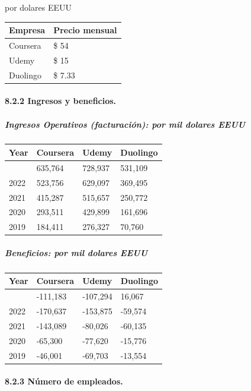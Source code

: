 \documentclass[
]{article}
\begin{document}
por dolares EEUU

\begin{longtable}[]{@{}ll@{}}
\toprule\noalign{}
Empresa & Precio mensual \\
\midrule\noalign{}
\endhead
\bottomrule\noalign{}
\endlastfoot
Coursera & \$ 54 \\
Udemy & \$ 15 \\
Duolingo & \$ 7.33 \\
\end{longtable}

\paragraph{8.2.2 Ingresos y beneficios.}\label{ingresos-y-beneficios.}

\subparagraph{Ingresos Operativos (facturación): por mil dolares
EEUU}\label{ingresos-operativos-facturaciuxf3n-por-mil-dolares-eeuu}

\begin{longtable}[]{@{}llll@{}}
\toprule\noalign{}
Year & Coursera & Udemy & Duolingo \\
\midrule\noalign{}
\endhead
\bottomrule\noalign{}
\endlastfoot
2023 & 635,764 & 728,937 & 531,109 \\
2022 & 523,756 & 629,097 & 369,495 \\
2021 & 415,287 & 515,657 & 250,772 \\
2020 & 293,511 & 429,899 & 161,696 \\
2019 & 184,411 & 276,327 & 70,760 \\
\end{longtable}

\subparagraph{Beneficios: por mil dolares
EEUU}\label{beneficios-por-mil-dolares-eeuu}

\begin{longtable}[]{@{}llll@{}}
\toprule\noalign{}
Year & Coursera & Udemy & Duolingo \\
\midrule\noalign{}
\endhead
\bottomrule\noalign{}
\endlastfoot
2023 & -111,183 & -107,294 & 16,067 \\
2022 & -170,637 & -153,875 & -59,574 \\
2021 & -143,089 & -80,026 & -60,135 \\
2020 & -65,300 & -77,620 & -15,776 \\
2019 & -46,001 & -69,703 & -13,554 \\
\end{longtable}

\paragraph{8.2.3 Número de empleados.}\label{nuxfamero-de-empleados.}
\end{document}
